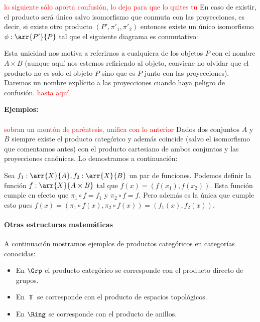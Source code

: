 \textcolor{red}{lo siguiente sólo aporta confusión, lo dejo para que lo quites tu }
	En caso de existir, el producto será único salvo isomorfismo
	que conmuta con las proyecciones, es decir, si existe otro
	producto $(P', \pi'_1, \pi'_2)$ entonces
	existe un único isomorfismo $\phi : \arr{P'}{P}$ tal que
	el siguiente diagrama
	es conmutativo:
	\begin{center}
	\end{center}
	Esta unicidad nos motiva a referirnos a cualquiera de los objetos
	$P$ con el nombre $A\times B$ (aunque aquí nos estemos refiriendo
	al objeto, conviene no olvidar que el producto no es solo el objeto
	$P$ sino que es $P$ junto con las proyecciones). Daremos un nombre
	explícito a las proyecciones cuando haya peligro de confusión.
\textcolor{red}{hasta aquí}

\textbf{\large Ejemplos:}
\paragraph{\Set} \textcolor{red}{sobran un montón de paréntesis, unifica con lo anterior}
Dados dos conjuntos $A$ y $B$ siempre existe el producto categórico
y además coincide (salvo el isomorfismo
que comentamos antes) con el producto cartesiano de ambos conjuntos
y las proyecciones canónicas. Lo demostramos a continuación:

Sea $f_1 : \arr{X}{A}, f_2 : \arr{X}{B}$ un par de funciones. Podemos
definir la función $f : \arr{X}{A\times B}$ tal que
$f(x) = (f(x_1), f(x_2))$. Esta función cumple en efecto que
$\pi_1 \circ f = f_1$ y $\pi_2 \circ f = f$. Pero además es la única
que cumple esto pues
$f(x)=(\pi_1\circ f(x), \pi_2\circ f(x))=(f_1(x), f_2(x))$.

\paragraph{Otras estructuras matemáticas}
A continuación mostramos ejemplos de productos categóricos
en categorías conocidas:

\begin{itemize}
	\item En $\Grp$ el producto categórico se corresponde con el
	producto directo de grupos.
	\item En $\Top$ se corresponde con el producto de espacios topológicos.
	\item En $\Ring$ se corresponde con el producto de anillos.
\end{itemize}

